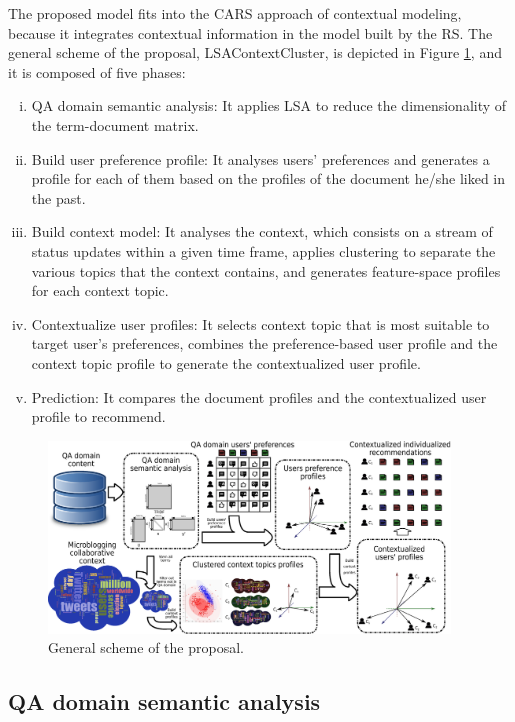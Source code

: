 \documentclass[preprint]{elsarticle}
\begin{document}
\begin{spacing}{1.5}
The proposed model fits into the CARS approach of contextual modeling, because it integrates contextual information in the model built by the RS. The general scheme of the proposal, LSAContextCluster, is depicted in Figure \ref{fig:proposal-scheme}, and it is composed of five phases:
\begin{enumerate}[(i)]
	\item QA domain semantic analysis: It applies LSA to reduce the dimensionality of the term-document matrix.
	\item Build user preference profile: It analyses users' preferences and generates a profile for each of them based on the profiles of the document he/she liked in the past.
	\item Build context model: It analyses the context, which consists on a stream of status updates within a given time frame, applies clustering to separate the various topics that the context contains, and generates feature-space profiles for each context topic.
	\item Contextualize user profiles: It selects context topic that is most suitable to target user's preferences, combines the preference-based user profile and the context topic profile to generate the contextualized user profile.
	\item Prediction: It compares the document profiles and the contextualized user profile to recommend.
\end{enumerate}

\begin{figure}[h]
	\centering
	\includegraphics[width=0.95\textwidth]{figures/proposal-scheme-v4.eps}
	\caption{General scheme of the proposal.}
	\label{fig:proposal-scheme}
\end{figure}

\subsection{QA domain semantic analysis}
\label{sec:proposal-qa-semantic-analysis}


\end{spacing}
\end{document}
